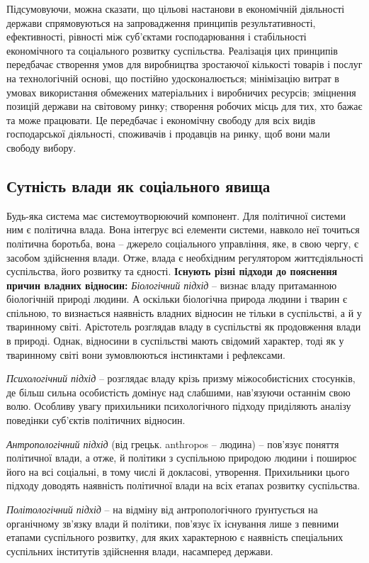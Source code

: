 Підсумовуючи, можна сказати, що цільові настанови в економічній діяльності держави спрямовуються на запровадження принципів результативності, ефективності, рівності між суб’єктами господарювання і стабільності економічного та соціального розвитку суспільства. Реалізація цих принципів передбачає створення умов для виробництва зростаючої кількості товарів і послуг на технологічній основі, що постійно удосконалюється; мінімізацію витрат в умовах використання обмежених матеріальних і виробничих ресурсів; зміцнення позицій держави на світовому ринку; створення робочих місць для тих, хто бажає та може працювати. Це передбачає і економічну свободу для всіх видів господарської діяльності, споживачів і продавців на ринку, щоб вони мали свободу вибору.
\subsection{Сутність влади як соціального явища}
Будь-яка система має системоутворюючий компонент. Для політичної системи ним є політична влада. Вона інтегрує всі елементи системи, навколо неї точиться політична боротьба, вона – джерело соціального управління, яке, в свою чергу, є засобом здійснення влади. Отже, влада є необхідним регулятором життєдіяльності суспільства, його розвитку та єдності.
\noindent\textbf{Існують різні підходи до пояснення причин владних відносин:}
\textit{Біологічний підхід} – визнає владу притаманною біологічній природі людини. А оскільки біологічна природа людини і тварин є спільною, то визнається наявність владних відносин не тільки в суспільстві, а й у тваринному світі. Арістотель розглядав владу в суспільстві як продовження влади в природі. Однак, відносини в суспільстві мають свідомий характер, тоді як у тваринному світі вони зумовлюються інстинктами і рефлексами.

\textit{Психологічний підхід} – розглядає владу крізь призму міжособистісних стосунків, де більш сильна особистість домінує над слабшими, нав’язуючи останнім свою волю. Особливу увагу прихильники психологічного підходу приділяють аналізу поведінки суб’єктів політичних відносин.

\textit{Антропологічний підхід} (від грецьк. anthropos – людина) – пов’язує поняття політичної влади, а отже, й політики з суспільною природою людини і поширює його на всі соціальні, в тому числі й докласові, утворення. Прихильники цього підходу доводять наявність політичної влади на всіх етапах розвитку суспільства.

\textit{Політологічний підхід} – на відміну від антропологічного ґрунтується на органічному зв’язку влади й політики, пов’язує їх існування лише з певними етапами суспільного розвитку, для яких характерною є наявність спеціальних суспільних інститутів здійснення влади, насамперед держави.

